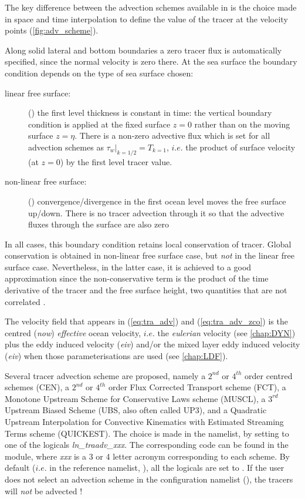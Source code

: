 \documentclass[../tex_main/NEMO_manual]{subfiles}
\begin{document}
The key difference between the advection schemes available in \NEMO is the choice 
made in space and time interpolation to define the value of the tracer at the 
velocity points (\autoref{fig:adv_scheme}). 

Along solid lateral and bottom boundaries a zero tracer flux is automatically 
specified, since the normal velocity is zero there. At the sea surface the 
boundary condition depends on the type of sea surface chosen: 
\begin{description}
\item [linear free surface:] () the first level thickness is constant in time: 
the vertical boundary condition is applied at the fixed surface $z=0$ 
rather than on the moving surface $z=\eta$. There is a non-zero advective 
flux which is set for all advection schemes as 
$\left. {\tau _w } \right|_{k=1/2} =T_{k=1} $, $i.e.$ 
the product of surface velocity (at $z=0$) by the first level tracer value.
\item [non-linear free surface:] () 
convergence/divergence in the first ocean level moves the free surface 
up/down. There is no tracer advection through it so that the advective 
fluxes through the surface are also zero 
\end{description}
In all cases, this boundary condition retains local conservation of tracer. 
Global conservation is obtained in non-linear free surface case, 
but \textit{not} in the linear free surface case. Nevertheless, in the latter case, 
it is achieved to a good approximation since the non-conservative 
term is the product of the time derivative of the tracer and the free surface 
height, two quantities that are not correlated \citep{Roullet_Madec_JGR00,Griffies_al_MWR01,Campin2004}.

The velocity field that appears in (\autoref{eq:tra_adv}) and (\autoref{eq:tra_adv_zco}) 
is the centred (\textit{now}) \textit{effective} ocean velocity, $i.e.$ the \textit{eulerian} velocity
(see \autoref{chap:DYN}) plus the eddy induced velocity (\textit{eiv}) 
and/or the mixed layer eddy induced velocity (\textit{eiv})
when those parameterisations are used (see \autoref{chap:LDF}).

Several tracer advection scheme are proposed, namely 
a $2^{nd}$ or $4^{th}$ order centred schemes (CEN), 
a $2^{nd}$ or $4^{th}$ order Flux Corrected Transport scheme (FCT),
a Monotone Upstream Scheme for Conservative Laws scheme (MUSCL),
a $3^{rd}$ Upstream Biased Scheme (UBS, also often called UP3), and
a Quadratic Upstream Interpolation for Convective Kinematics with 
Estimated Streaming Terms scheme (QUICKEST).
The choice is made in the \textit{} namelist, by 
setting to  one of the logicals \textit{ln\_traadv\_xxx}. 
The corresponding code can be found in the  module, 
where \textit{xxx} is a 3 or 4 letter acronym corresponding to each scheme. 
By default ($i.e.$ in the reference namelist, ), all the logicals 
are set to . If the user does not select an advection scheme 
in the configuration namelist (), the tracers will \textit{not} be advected !
\end{document}
